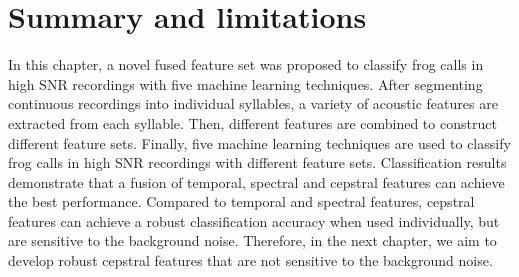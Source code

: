 \section{Summary and limitations}

In this chapter, a novel fused feature set was proposed to classify frog calls in high SNR recordings with five machine learning techniques.
After segmenting continuous recordings into individual syllables, a variety of acoustic features are extracted from each syllable. Then, different features are combined to construct different feature sets. Finally, five machine learning techniques are used to classify frog calls in high SNR recordings with different feature sets. Classification results demonstrate that a fusion of temporal, spectral and cepstral features can achieve the best performance. Compared to temporal and spectral features, cepstral features can achieve a robust classification accuracy when used individually, but are sensitive to the background noise. Therefore, in the next chapter, we aim to develop robust cepstral features that are not sensitive to the background noise.


%
